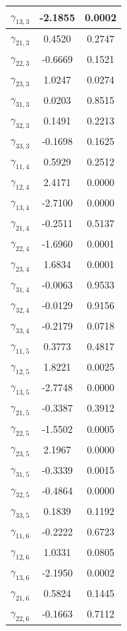 \documentclass[a4paper, 12pt, openany, oneside, brazil]{abntex2}
\begin{document}
\begin{apendicesenv}
\begin{longtable}{|c|c|c|}
	\hline
	$\gamma_{13,3}$ & -2.1855 & 0.0002 \\
	\hline
	$\gamma_{21,3}$ & 0.4520 & 0.2747 \\
	\hline
	$\gamma_{22,3}$ & -0.6669 & 0.1521 \\
	\hline
	$\gamma_{23,3}$ & 1.0247 & 0.0274 \\
	\hline
	$\gamma_{31,3}$ & 0.0203 & 0.8515 \\
	\hline
	$\gamma_{32,3}$ & 0.1491 & 0.2213 \\
	\hline
	$\gamma_{33,3}$ & -0.1698 & 0.1625 \\
	\hline
	$\gamma_{11,4}$ & 0.5929 & 0.2512 \\
	\hline
	$\gamma_{12,4}$ & 2.4171 & 0.0000 \\
	\hline
	$\gamma_{13,4}$ & -2.7100 & 0.0000 \\
	\hline
	$\gamma_{21,4}$ & -0.2511 & 0.5137 \\
	\hline
	$\gamma_{22,4}$ & -1.6960 & 0.0001 \\
	\hline
	$\gamma_{23,4}$ & 1.6834 & 0.0001 \\
	\hline
	$\gamma_{31,4}$ & -0.0063 & 0.9533 \\
	\hline
	$\gamma_{32,4}$ & -0.0129 & 0.9156 \\
	\hline
	$\gamma_{33,4}$ & -0.2179 & 0.0718 \\
	\hline
	$\gamma_{11,5}$ & 0.3773 & 0.4817 \\
	\hline
	$\gamma_{12,5}$ & 1.8221 & 0.0025 \\
	\hline
	$\gamma_{13,5}$ & -2.7748 & 0.0000 \\
	\hline
	$\gamma_{21,5}$ & -0.3387 & 0.3912 \\
	\hline
	$\gamma_{22,5}$ & -1.5502 & 0.0005 \\
	\hline
	$\gamma_{23,5}$ & 2.1967 & 0.0000 \\
	\hline
	$\gamma_{31,5}$ & -0.3339 & 0.0015 \\
	\hline
	$\gamma_{32,5}$ & -0.4864 & 0.0000 \\
	\hline
	$\gamma_{33,5}$ & 0.1839 & 0.1192 \\
	\hline
	$\gamma_{11,6}$ & -0.2222 & 0.6723 \\
	\hline
	$\gamma_{12,6}$ & 1.0331 & 0.0805 \\
	\hline
	$\gamma_{13,6}$ & -2.1950 & 0.0002 \\
	\hline
	$\gamma_{21,6}$ & 0.5824 & 0.1445 \\
	\hline
	$\gamma_{22,6}$ & -0.1663 & 0.7112 \\
	\hline

\end{longtable}
\end{apendicesenv}
\end{document}
